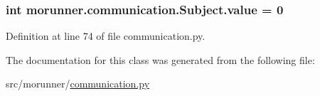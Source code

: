 \subsubsection[{value}]{\setlength{\rightskip}{0pt plus 5cm}int morunner.\+communication.\+Subject.\+value = 0\hspace{0.3cm}{\ttfamily [static]}}\label{classmorunner_1_1communication_1_1Subject_ab43ed6150da716dccc34f12e9ea60eb9}


Definition at line 74 of file communication.\+py.



The documentation for this class was generated from the following file\+:\begin{DoxyCompactItemize}
\item 
src/morunner/\hyperlink{communication_8py}{communication.\+py}\end{DoxyCompactItemize}
